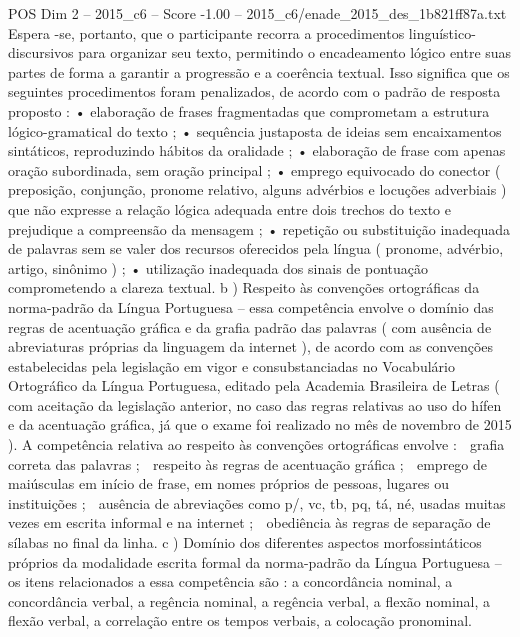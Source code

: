 \begin{textsample}{POS Dim 2 – 2015\_c6 – Score -1.00 – 2015\_c6/enade\_2015\_des\_1b821ff87a.txt}
Espera -se, portanto, que o participante recorra a procedimentos linguístico-discursivos para organizar seu texto, permitindo o encadeamento lógico entre suas partes de forma a garantir a progressão e a coerência textual.
Isso significa que os seguintes procedimentos foram penalizados, de acordo com o padrão de resposta proposto : • elaboração de frases fragmentadas que comprometam a estrutura lógico-gramatical do texto ; • sequência justaposta de ideias sem encaixamentos sintáticos, reproduzindo hábitos da oralidade ; • elaboração de frase com apenas oração subordinada, sem oração principal ; • emprego equivocado do conector ( preposição, conjunção, pronome relativo, alguns advérbios e locuções adverbiais ) que não expresse a relação lógica adequada entre dois trechos do texto e prejudique a compreensão da mensagem ; • repetição ou substituição inadequada de palavras sem se valer dos recursos oferecidos pela língua ( pronome, advérbio, artigo, sinônimo ) ; • utilização inadequada dos sinais de pontuação comprometendo a clareza textual. b ) Respeito às convenções ortográficas da norma-padrão da Língua Portuguesa – essa competência envolve o domínio das regras de acentuação gráfica e da grafia padrão das palavras ( com ausência de abreviaturas próprias da linguagem da internet ), de acordo com as convenções estabelecidas pela legislação em vigor e consubstanciadas no Vocabulário Ortográfico da Língua Portuguesa, editado pela Academia Brasileira de Letras ( com aceitação da legislação anterior, no caso das regras relativas ao uso do hífen e da acentuação gráfica, já que o exame foi realizado no mês de novembro de 2015 ).
A competência relativa ao respeito às convenções ortográficas envolve :  grafia correta das palavras ;  respeito às regras de acentuação gráfica ;  emprego de maiúsculas em início de frase, em nomes próprios de pessoas, lugares ou instituições ;  ausência de abreviações como p/, vc, tb, pq, tá, né, usadas muitas vezes em escrita informal e na internet ;  obediência às regras de separação de sílabas no final da linha. c ) Domínio dos diferentes aspectos morfossintáticos próprios da modalidade escrita formal da norma-padrão da Língua Portuguesa – os itens relacionados a essa competência são : a concordância nominal, a concordância verbal, a regência nominal, a regência verbal, a flexão nominal, a flexão verbal, a correlação entre os tempos verbais, a colocação pronominal.

\end{textsample}
